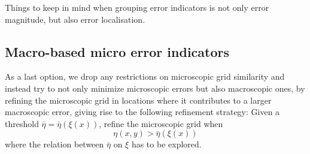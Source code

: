 \documentclass{article}
\begin{document}
Things to keep in mind when grouping error indicators is not only error magnitude, but also error localisation.

\subsection{Macro-based micro error indicators}
As a last option, we drop any restrictions on microscopic grid similarity and instead try to not only minimize microscopic errors but also macroscopic ones, by refining the microscopic grid in locations where it contributes to a larger macroscopic error, giving rise to the following refinement strategy: Given a threshold $\bar{\eta}= \bar{\eta}(\xi(x))$, refine the microscopic grid when
\begin{equation}
    \eta(x,y) > \bar{\eta}(\xi(x))
\end{equation}
where the relation between $\bar{\eta}$ on $\xi$ has to be explored.


\end{document}

